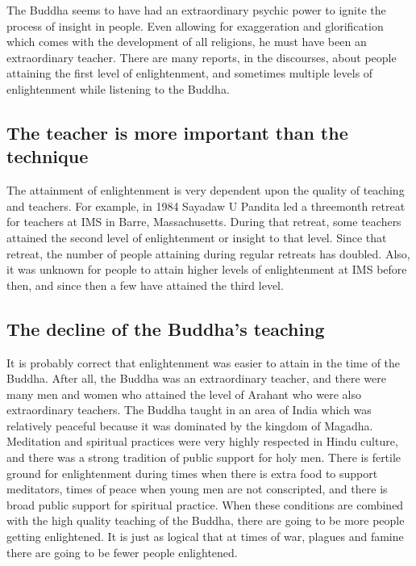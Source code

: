 \documentclass[a5paper,10pt,english]{book}
\begin{document}
\sphinxAtStartPar
The Buddha seems to have had an extraordinary psychic power to ignite
the process of insight in people. Even allowing for exaggeration and
glorification which comes with the development of all religions, he must
have been an extraordinary teacher. There are many reports, in the
discourses, about people attaining the first level of enlightenment, and
sometimes multiple levels of enlightenment while listening to the
Buddha.


\subsection{The teacher is more important than the technique}
\label{\detokenize{saints:the-teacher-is-more-important-than-the-technique}}
\sphinxAtStartPar
The attainment of enlightenment is very dependent upon the quality of
teaching and teachers. For example, in 1984 Sayadaw U Pandita led a
three\sphinxhyphen{}month retreat for teachers at IMS in Barre, Massachusetts. During
that retreat, some teachers attained the second level of enlightenment
or insight to that level. Since that retreat, the number of people
attaining  during regular retreats has doubled. Also, it
was unknown for people to attain higher levels of enlightenment at IMS
before then, and since then a few have attained the third level.


\subsection{The decline of the Buddha’s teaching}
\label{\detokenize{saints:the-decline-of-the-buddha-s-teaching}}
\sphinxAtStartPar
It is probably correct that enlightenment was easier to attain in the
time of the Buddha. After all, the Buddha was an extraordinary teacher,
and there were many men and women who attained the level of Arahant who
were also extraordinary teachers. The Buddha taught in an area of India
which was relatively peaceful because it was dominated by the kingdom of
Magadha. Meditation and spiritual practices were very highly respected
in Hindu culture, and there was a strong tradition of public support for
holy men. There is fertile ground for enlightenment during times when
there is extra food to support meditators, times of peace when young men
are not conscripted, and there is broad public support for spiritual
practice. When these conditions are combined with the high quality
teaching of the Buddha, there are going to be more people getting
enlightened. It is just as logical that at times of war, plagues and
famine there are going to be fewer people enlightened.
\end{document}
